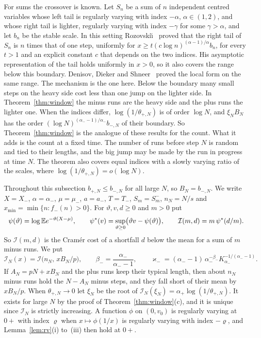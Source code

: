 For sums the crossover is known. Let $S_n$ be a sum of $n$ independent centred
variables whose left tail is regularly varying with index $-\alpha$, $\alpha\in(1,2)$, and
whose right tail is lighter, regularly varying with index $-\gamma$ for some $\gamma>\alpha$,
and let $b_n$ be the stable scale. In this setting
Rozovski\u{\i}~\cite[Corollary~2A]{rozovskii1997} proved that the right tail of $S_n$ is $n$
times that of one step, uniformly for $x\ge t(c\log n)^{(\alpha-1)/\alpha}b_n$, for every
$t>1$ and an explicit constant $c$ that depends on the two indices. His asymptotic
representation of the tail holds uniformly in $x>0$, so it also covers the range below
this boundary. Denisov, Dieker and Shneer~\cite[Proposition~9.2 and Theorem~9.2]{dds2008}
proved the local form on the same range. The mechanism is the one here. Below the boundary
many small steps on the heavy side cost less than one jump on the lighter side. In
Theorem~\ref{thm:window} the minus runs are the heavy side and the plus runs the lighter
one. When the indices differ, $\log(1/\theta_{\plus,N})$ is of order $\log N$, and $\xi_NB_N$
has the order $(\log N)^{(\alpha_\minus-1)/\alpha_\minus}b_{\minus,N}$ of their boundary. So
Theorem~\ref{thm:window} is the analogue of these results for the count. What it adds is
the count at a fixed time. The number of runs before step $N$ is random and tied to their
lengths, and the big jump may be made by the run in progress at time $N$. The theorem
also covers equal indices with a slowly varying ratio of the scales, where
$\log(1/\theta_{\plus,N})=o(\log N)$.

Throughout this subsection $b_{\plus,N}\le b_{\minus,N}$ for all large $N$, so
$B_N=b_{\minus,N}$. We write $X=X_\minus$, $\alpha=\alpha_\minus$, $\mu=\mu_\minus$,
$a=a_\minus$, $T=T_\minus$, $S_m=S^\minus_m$, $n_N=N/s$ and
$x_{\min}=\min\{n:f_\minus(n)>0\}$. For $\vartheta,v,d\ge0$ and $m>0$ put
\[
 \psi(\vartheta)=\log\mathbb{E} e^{-\vartheta(X-\mu)},\qquad
 \psi^*(v)=\sup_{\vartheta\ge0}\bigl(\vartheta v-\psi(\vartheta)\bigr),\qquad
 \mathcal I(m,d)=m\,\psi^*(d/m).
\]
So $\mathcal I(m,d)$ is the Cram\'er cost of a shortfall $d$ below the mean for a sum of
$m$ minus runs. We put
\begin{equation}\label{eq:IN}
 \mathcal I_N(x)=\mathcal I\bigl(n_N,\,xB_N/p\bigr),\qquad
 \beta_\minus=\frac{\alpha_\minus}{\alpha_\minus-1},\qquad
 \varkappa_\minus=(\alpha_\minus-1)\,\alpha_\minus^{-\beta_\minus}K_{\alpha_\minus}^{-1/(\alpha_\minus-1)} .
\end{equation}
If $A_N=pN+xB_N$ and the plus runs keep their typical length, then about $n_N$ minus
runs hold the $N-A_N$ minus steps, and they fall short of their mean by $xB_N/p$. When
$\theta_{\plus,N}\to0$ let $\xi_N$ be the root of
$\mathcal I_N(\xi_N)=\alpha_\plus\log(1/\theta_{\plus,N})$. It exists for large $N$ by the
proof of Theorem~\ref{thm:window}(c), and it is unique since $\mathcal I_N$ is strictly
increasing. A function $\phi$ on $(0,v_0)$ is regularly varying at $0+$ with index
$\varrho$ when $x\mapsto\phi(1/x)$ is regularly varying with index $-\varrho$, and
Lemma~\ref{lem:rv}(i) to~(iii) then hold at $0+$.

